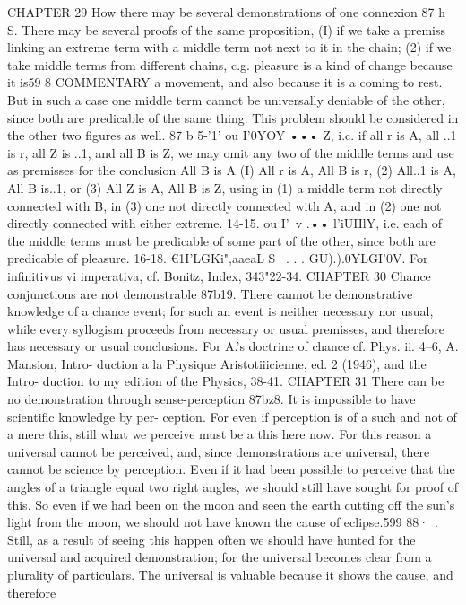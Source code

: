 {{{{{{{{{{{{{{{{{{{{{{{{{{{{{{{{{{{{{CHAPTER 29
How there may be several demonstrations of one connexion
87 h S. There may be several proofs of the same proposition,
(I) if we take a premiss linking an extreme term with a middle
term not next to it in the chain; (2) if we take middle terms from
different chains, c.g. pleasure is a kind of change because it is59 8
COMMENTARY
a movement, and also because it is a coming to rest. But in such
a case one middle term cannot be universally deniable of the
other, since both are predicable of the same thing. This problem
should be considered in the other two figures as well.
87 b 5-'1' ou I'0YOY ••• Z, i.c. if all r is A, all ..1 is r, all Z is ..1,
and all B is Z, we may omit any two of the middle terms and use
as premisses for the conclusion All B is A (I) All r is A, All B is
r, (2) All..1 is A, All B is..1, or (3) All Z is A, All B is Z, using
in (1) a middle term not directly connected with B, in (3) one not
directly connected with A, and in (2) one not directly connected
with either extreme.
14-15. ou I'~v .•• l'iUIIlY, i.e. each of the middle terms must
be predicable of some part of the other, since both are predicable
of pleasure.
16-18. €1I'LGKi",aaeaL S~ . . . GU).).0YLGI'0V. For infinitivus vi
imperativa, cf. Bonitz, Index, 343"22-34.
CHAPTER 30
Chance conjunctions are not demonstrable
87b19. There cannot be demonstrative knowledge of a chance
event; for such an event is neither necessary nor usual, while
every syllogism proceeds from necessary or usual premisses, and
therefore has necessary or usual conclusions.
For A.'s doctrine of chance cf. Phys. ii. 4--6, A. Mansion, Intro-
duction a la Physique Aristotiiicienne, ed. 2 (1946), and the Intro-
duction to my edition of the Physics, 38-41.
CHAPTER 31
There can be no demonstration through sense-perception
87bz8. It is impossible to have scientific knowledge by per-
ception. For even if perception is of a such and not of a mere
this, still what we perceive must be a this here now. For this
reason a universal cannot be perceived, and, since demonstrations
are universal, there cannot be science by perception. Even if it
had been possible to perceive that the angles of a triangle equal
two right angles, we should still have sought for proof of this.
So even if we had been on the moon and seen the earth cutting
off the sun's light from the moon, we should not have known the
cause of eclipse.599
88·~.
Still, as a result of seeing this happen often we should
have hunted for the universal and acquired demonstration; for
the universal becomes clear from a plurality of particulars. The
universal is valuable because it shows the cause, and therefore
}}}}}}}}}}}}}}}}}}}}}}}}}}}}}}}}}}}}}
